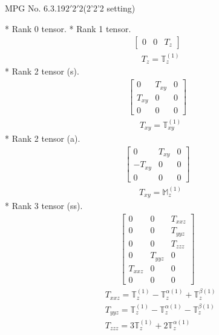 \documentclass[fleqn,8pt,landscape]{jsarticle}
\begin{document}
\setcounter{MaxMatrixCols}{32}

\renewcommand{\tablename}{Table~}
\renewcommand{\figurename}{Figure~}
\begin{center}
\LARGE
MPG No. 6.3.19\quad$2'2'2$\quad(2'2'2 setting)
\end{center}
* Rank 0 tensor.
* Rank 1 tensor.
\begin{align*}
\begin{bmatrix} 0 & 0 & T_{z} \end{bmatrix}
\end{align*}
\begin{align*}
& T_{z} = \mathbb{T}_{z}^{(1)}
\end{align*}
* Rank 2 tensor (s).
\begin{align*}
\begin{bmatrix} 0 & T_{xy} & 0 \\ T_{xy} & 0 & 0 \\ 0 & 0 & 0 \end{bmatrix}
\end{align*}
\begin{align*}
& T_{xy} = \mathbb{T}_{xy}^{(1)}
\end{align*}
* Rank 2 tensor (a).
\begin{align*}
\begin{bmatrix} 0 & T_{xy} & 0 \\ - T_{xy} & 0 & 0 \\ 0 & 0 & 0 \end{bmatrix}
\end{align*}
\begin{align*}
& T_{xy} = \mathbb{M}_{z}^{(1)}
\end{align*}
* Rank 3 tensor (ss).
\begin{align*}
\begin{bmatrix} 0 & 0 & T_{xxz} \\ 0 & 0 & T_{yyz} \\ 0 & 0 & T_{zzz} \\ 0 & T_{yyz} & 0 \\ T_{xxz} & 0 & 0 \\ 0 & 0 & 0 \end{bmatrix}
\end{align*}
\begin{align*}
& T_{xxz} = \mathbb{T}_{z}^{(1)} - \mathbb{T}_{z}^{\alpha(1)} + \mathbb{T}_{z}^{\beta(1)} \\
& T_{yyz} = \mathbb{T}_{z}^{(1)} - \mathbb{T}_{z}^{\alpha(1)} - \mathbb{T}_{z}^{\beta(1)} \\
& T_{zzz} = 3 \mathbb{T}_{z}^{(1)} + 2 \mathbb{T}_{z}^{\alpha(1)}
\end{align*}
\end{document}
